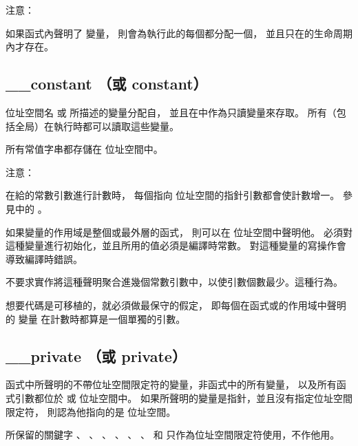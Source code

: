 注意：

如果函式內聲明了  變量，
則會為執行此的每個都分配一個，
並且只在的生命周期內才存在。

\subsection{__constant （或 constant）}

位址空間名  或  所描述的變量分配自，
並且在中作為只讀變量來存取。
所有（包括全局）在執行時都可以讀取這些變量。

所有常值字串都存儲在  位址空間中。

注意：

在給的常數引數進行計數時，
每個指向  位址空間的指針引數都會使計數增一。
參見中的 。

如果變量的作用域是整個或最外層的函式，
則可以在  位址空間中聲明他。
必須對這種變量進行初始化，並且所用的值必須是編譯時常數。
對這種變量的寫操作會導致編譯時錯誤。

不要求實作將這種聲明聚合進幾個常數引數中，以使引數個數最少。這種行為。

想要代碼是可移植的，就必須做最保守的假定，
即每個在函式或的作用域中聲明的  變量
在計數時都算是一個單獨的引數。

\subsection{__private （或 private）}

函式中所聲明的不帶位址空間限定符的變量，非函式中的所有變量，
以及所有函式引數都位於  或  位址空間中。
如果所聲明的變量是指針，並且沒有指定位址空間限定符，
則認為他指向的是  位址空間。

所保留的關鍵字
 、 、 、 、
 、 、  和 
 只作為位址空間限定符使用，不作他用。
